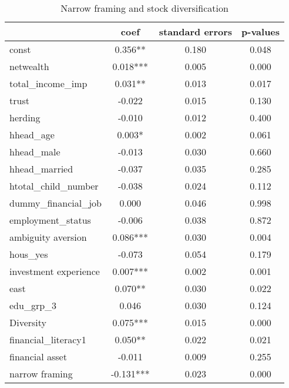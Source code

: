 \documentclass[ukenglish,nottitlepage,thmsb,11pt,letterpaper]{article}
\begin{document}
\begin{table}[H]
	\centering
	\caption{Narrow framing and stock diversification}
		\begin{tabular*}{\textwidth}{l @{\extracolsep{\fill}} ccc}
		\toprule
		& coef         & standard errors & p-values \\
		\midrule
		 const                   &0.356**	 &0.180	 &0.048 \\
		 netwealth               &0.018***	 &0.005	 &0.000 \\
		 total\_income\_imp      &0.031**	 &0.013	 &0.017 \\
		 trust                   &-0.022	 &0.015	 &0.130 \\
		 herding                 &-0.010	 &0.012	 &0.400 \\
		 hhead\_age              &0.003*	 &0.002	 &0.061 \\
		 hhead\_male             &-0.013	 &0.030	 &0.660 \\
		 hhead\_married          &-0.037	 &0.035	 &0.285 \\
		 htotal\_child\_number   &-0.038	 &0.024	 &0.112 \\
		 dummy\_financial\_job   &0.000	     &0.046	 &0.998 \\
		 employment\_status      &-0.006	 &0.038	 &0.872 \\
		 ambiguity aversion      &0.086***	 &0.030	 &0.004 \\
		 hous\_yes               &-0.073	 &0.054	 &0.179 \\
		 investment experience   &0.007***	 &0.002	 &0.001 \\
		 east                    &0.070**	 &0.030	 &0.022 \\
		 edu\_grp\_3             &0.046	     &0.030	 &0.124 \\
		 Diversity               &0.075***	 &0.015	 &0.000 \\
		 financial\_literacy1    &0.050**	 &0.022	 &0.021 \\
		 financial asset         &-0.011     &0.009	 &0.255 \\
		 narrow framing          &-0.131***	 &0.023	 &0.000 \\
		

\end{tabular*}
\end{table}
\end{document}

